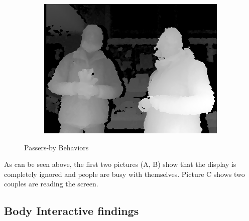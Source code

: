 \begin{figure}[H]
\begin{subfigure}[H]{0.32\textwidth}
        \centering
        \includegraphics[width=\textwidth]{Figures/8/non_inter_findings/effects/reading}
        \caption{}
        \label{fig:non-reading}
    \end{subfigure}
    \caption{Passers-by Behaviors}
    \label{fig:three-non-behavior}
\end{figure}

As can be seen above, the first two pictures (A, B) show that the display is completely ignored and people are busy with themselves. Picture C shows two couples are reading the screen.



\subsection{Body Interactive findings}

